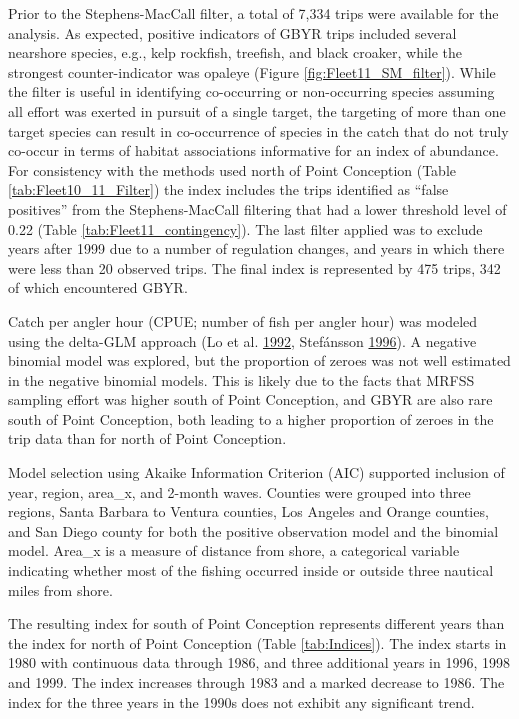 \documentclass[12pt,]{article}
\begin{document}
Prior to the Stephens-MacCall filter, a total of 7,334 trips were
available for the analysis. As expected, positive indicators of GBYR
trips included several nearshore species, e.g., kelp rockfish, treefish,
and black croaker, while the strongest counter-indicator was opaleye
(Figure \ref{fig:Fleet11_SM_filter}). While the filter is useful in
identifying co-occurring or non-occurring species assuming all effort
was exerted in pursuit of a single target, the targeting of more than
one target species can result in co-occurrence of species in the catch
that do not truly co-occur in terms of habitat associations informative
for an index of abundance. For consistency with the methods used north
of Point Conception (Table \ref{tab:Fleet10_11_Filter}) the index
includes the trips identified as ``false positives'' from the
Stephens-MacCall filtering that had a lower threshold level of 0.22
(Table \ref{tab:Fleet11_contingency}). The last filter applied was to
exclude years after 1999 due to a number of regulation changes, and
years in which there were less than 20 observed trips. The final index
is represented by 475 trips, 342 of which encountered GBYR.

Catch per angler hour (CPUE; number of fish per angler hour) was modeled
using the delta-GLM approach (Lo et al.
\protect\hyperlink{ref-Lo1992}{1992}, Stefánsson
\protect\hyperlink{ref-Stefansson1996}{1996}). A negative binomial model
was explored, but the proportion of zeroes was not well estimated in the
negative binomial models. This is likely due to the facts that MRFSS
sampling effort was higher south of Point Conception, and GBYR are also
rare south of Point Conception, both leading to a higher proportion of
zeroes in the trip data than for north of Point Conception.

Model selection using Akaike Information Criterion (AIC) supported
inclusion of year, region, area\_x, and 2-month waves. Counties were
grouped into three regions, Santa Barbara to Ventura counties, Los
Angeles and Orange counties, and San Diego county for both the positive
observation model and the binomial model. Area\_x is a measure of
distance from shore, a categorical variable indicating whether most of
the fishing occurred inside or outside three nautical miles from shore.

The resulting index for south of Point Conception represents different
years than the index for north of Point Conception (Table
\ref{tab:Indices}). The index starts in 1980 with continuous data
through 1986, and three additional years in 1996, 1998 and 1999. The
index increases through 1983 and a marked decrease to 1986. The index
for the three years in the 1990s does not exhibit any significant trend.
\end{document}
